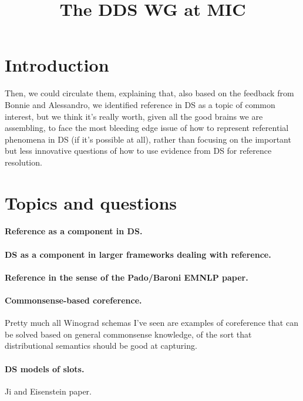 \documentclass[a4paper,12pt]{article}
\title{The DDS WG at MIC}
\begin{document}
\maketitle

\section{Introduction}
Then, we could circulate them, explaining that, also based
on the feedback
from Bonnie and Alessandro, we identified reference in DS as
a topic of
common interest, but we think it's really worth, given all
the good brains
we are assembling, to face the most bleeding edge issue of
how to represent
referential phenomena in DS (if it's possible at all),
rather than focusing
on the important but less innovative questions of how to use
evidence from
DS for reference resolution.



\section{Topics and questions}

\paragraph{Reference as a component in DS.}

\paragraph{DS as a component in larger frameworks dealing with reference.}

\paragraph{Reference in the sense of the Pado/Baroni EMNLP paper.}

\paragraph{Commonsense-based coreference.}
Pretty much all Winograd schemas I've seen are examples of
coreference that can be solved based on general commonsense
knowledge, of the sort that distributional semantics should
be good at capturing.

\paragraph{DS models of slots.} Ji and Eisenstein paper.
\end{document}

